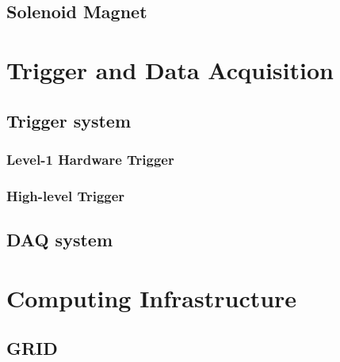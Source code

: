 \subsection{Solenoid Magnet}


\section{Trigger and Data Acquisition}  %
\label{sec:detector_daq}

\subsection{Trigger system}

\subsubsection{Level-1 Hardware Trigger}

\subsubsection{High-level Trigger}

\subsection{DAQ system}


\section{Computing Infrastructure}  %
\label{sec:detector_computing}

\subsection{GRID}